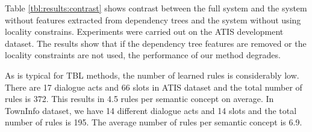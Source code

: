 \documentclass{article}
\newcommand{\efgr}[2]{
  \begin{figure}[htbp]
    \makebox[8.5cm]{\framebox[5cm]{\rule{0pt}{5cm}}}
    \caption{#2}
    \label{#1}
  \end{figure}
}
\begin{document}



Table \ref{tbl:results:contrast} shows contrast between the full system and the system without features extracted from dependency trees and the system without using locality constrains. Experiments were carried out on the ATIS development dataset. The results show that if the dependency tree features are removed or the locality constraints are not used, the performance of our method degrades.

As is typical for TBL methods, the number of learned rules is considerably low. There are 17 dialogue acts and 66 slots in ATIS dataset and the total number of rules is 372. This results in 4.5  rules per semantic concept on average. In TownInfo dataset, we have 14 different dialogue acts and 14 slots and the total number of rules is 195. The average number of rules per semantic concept is 6.9.

\end{document}
